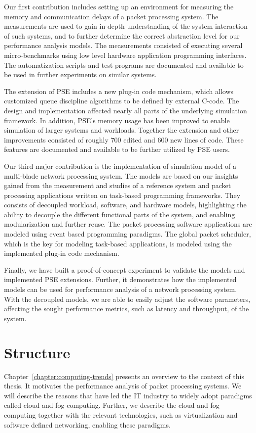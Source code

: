 Our first contribution includes setting up an environment for measuring the memory and communication delays of a packet processing system. The measurements are used to gain in-depth understanding of the system interaction of such systems, and to further determine the correct abstraction level for our performance analysis models. The measurements consisted of executing several micro-benchmarks using low level hardware application programming interfaces. The automatization scripts and test programs are documented and available to be used in further experiments on similar systems.

The extension of PSE includes a new plug-in code mechanism, which allows customized queue discipline algorithms to be defined by external C-code. The design and implementation affected nearly all parts of the underlying simulation framework. In addition, PSE's memory usage has been improved to enable simulation of larger systems and workloads. Together the extension and other improvements consisted of roughly 700 edited and 600 new lines of code. These features are documented and available to be further utilized by PSE users.

Our third major contribution is the implementation of simulation model of a multi-blade network processing system. The models are based on our insights gained from the measurement and studies of a reference system and packet processing applications written on task-based programming frameworks. They consists of decoupled workload, software, and hardware models, highlighting the ability to decouple the different functional parts of the system, and enabling modularization and further reuse. The packet processing software applications are modeled using event based programming paradigms. The global packet scheduler, which is the key for modeling task-based applications, is modeled using the implemented plug-in code mechanism.

Finally, we have built a proof-of-concept experiment to validate the models and implemented PSE extensions. Further, it demonstrates how the implemented models can be used for performance analysis of a network processing system. With the decoupled models, we are able to easily adjust the software parameters, affecting the sought performance metrics, such as latency and throughput, of the system.

\section{Structure}
Chapter~\ref{chapter:computing-trends} presents an overview to the context of this thesis. It motivates the performance analysis of packet processing systems. We will describe the reasons that have led the IT industry to widely adopt paradigms called cloud and fog computing. Further, we describe the cloud and fog computing together with the relevant technologies, such as virtualization and software defined networking, enabling these paradigms.

